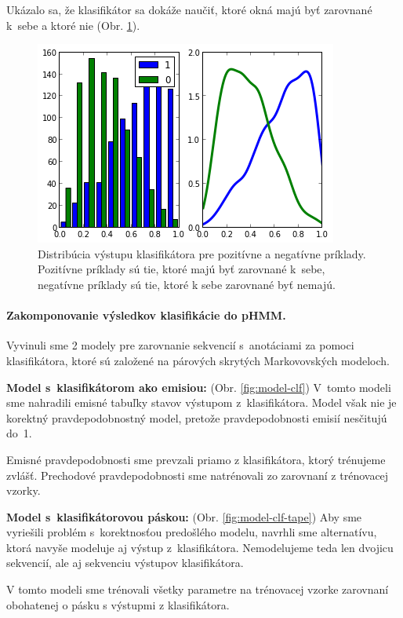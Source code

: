 \documentclass{svk_short_sk}
\begin{document}
Ukázalo sa, že klasifikátor sa dokáže naučiť, ktoré okná majú byť zarovnané k~sebe a ktoré nie (Obr. \ref{fig:clf-m-dist}).

\begin{figure}[H]
    \centering
    \includegraphics[width=.5\textwidth, clip=true]{images/clf_m_test}
    \caption{Distribúcia výstupu klasifikátora pre pozitívne a negatívne príklady. Pozitívne príklady sú tie, ktoré majú byť zarovnané k~sebe, negatívne príklady sú tie, ktoré k sebe zarovnané byť nemajú.}
    \label{fig:clf-m-dist}
\end{figure}

\paragraph{Zakomponovanie výsledkov klasifikácie do pHMM.}

Vyvinuli sme 2 modely pre zarovnanie sekvencií s~anotáciami za pomoci klasifikátora, ktoré sú založené na párových skrytých Markovovských modeloch.

\textbf{Model s~klasifikátorom ako emisiou:} (Obr. \ref{fig:model-clf})
V~tomto modeli sme nahradili emisné tabuľky stavov výstupom z~klasifikátora.
Model však nie je korektný pravdepodobnostný model, pretože pravdepodobnosti emisií nesčitujú do~1.

Emisné pravdepodobnosti sme prevzali priamo z klasifikátora, ktorý trénujeme zvlášť. Prechodové pravdepodobnosti sme natrénovali zo zarovnaní z trénovacej vzorky.

\textbf{Model s~klasifikátorovou páskou:} (Obr. \ref{fig:model-clf-tape})
Aby sme vyriešili problém s~korektnosťou predošlého modelu, navrhli sme alternatívu, ktorá navyše modeluje aj výstup z~klasifikátora.
Nemodelujeme teda len dvojicu sekvencií, ale aj sekvenciu výstupov klasifikátora.

V tomto modeli sme trénovali všetky parametre na trénovacej vzorke zarovnaní obohatenej o pásku s výstupmi z klasifikátora.
\end{document}
